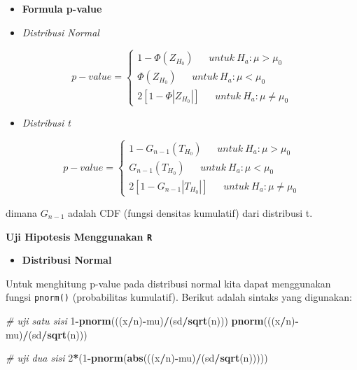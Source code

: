 \documentclass[]{book}
\newenvironment{Shaded}{\begin{snugshade}}{\end{snugshade}}
\newcommand{\KeywordTok}[1]{\textcolor[rgb]{0.13,0.29,0.53}{\textbf{#1}}}
\newcommand{\DecValTok}[1]{\textcolor[rgb]{0.00,0.00,0.81}{#1}}
\newcommand{\CommentTok}[1]{\textcolor[rgb]{0.56,0.35,0.01}{\textit{#1}}}
\newcommand{\OperatorTok}[1]{\textcolor[rgb]{0.81,0.36,0.00}{\textbf{#1}}}
\newcommand{\NormalTok}[1]{#1}
\providecommand{\tightlist}{%
  \setlength{\itemsep}{0pt}\setlength{\parskip}{0pt}}
\begin{document}
\begin{itemize}
\item
  \textbf{Formula p-value}
\item
  \emph{Distribusi Normal}
\end{itemize}

\begin{equation}
p-value =
  \begin{cases}
    1-\Phi\left(Z_{H_0}\right)\ \ \ \ \ \ \ untuk\ H_a:\mu>\mu_0\\
    \Phi\left(Z_{H_0}\right)\ \ \ \ \ \ \ untuk\ H_a:\mu<\mu_0\\
    2\left[1-\Phi\left|Z_{H_0}\right|\right]\ \ \ \ \ \ \ untuk\ H_a:\mu\ne \mu_0
    \end{cases}
  \label{eq:stparam3}
\end{equation}

\begin{itemize}
\tightlist
\item
  \emph{Distribusi t}
\end{itemize}

\begin{equation}
p-value =
  \begin{cases}
    1-G_{n-1}\left(T_{H_0}\right)\ \ \ \ \ \ \ untuk\ H_a:\mu>\mu_0\\
    G_{n-1}\left(T_{H_0}\right)\ \ \ \ \ \ \ untuk\ H_a:\mu<\mu_0\\
    2\left[1-G_{n-1}\left|T_{H_0}\right|\right]\ \ \ \ \ \ \ untuk\ H_a:\mu\ne \mu_0
    \end{cases}
  \label{eq:stparam4}
\end{equation}

dimana \(G_{n-1}\) adalah CDF (fungsi densitas kumulatif) dari
distribusi t.

\textbf{Uji Hipotesis Menggunakan \texttt{R}}

\begin{itemize}
\tightlist
\item
  \textbf{Distribusi Normal}
\end{itemize}

Untuk menghitung p-value pada distribusi normal kita dapat menggunakan
fungsi \texttt{pnorm()} (probabilitas kumulatif). Berikut adalah sintaks
yang digunakan:

\begin{Shaded}
\begin{Highlighting}[]
\CommentTok{# uji satu sisi}
\DecValTok{1}\OperatorTok{-}\KeywordTok{pnorm}\NormalTok{(((x}\OperatorTok{/}\NormalTok{n)}\OperatorTok{-}\NormalTok{mu)}\OperatorTok{/}\NormalTok{(sd}\OperatorTok{/}\KeywordTok{sqrt}\NormalTok{(n)))}
\KeywordTok{pnorm}\NormalTok{(((x}\OperatorTok{/}\NormalTok{n)}\OperatorTok{-}\NormalTok{mu)}\OperatorTok{/}\NormalTok{(sd}\OperatorTok{/}\KeywordTok{sqrt}\NormalTok{(n)))}

\CommentTok{# uji dua sisi}
\DecValTok{2}\OperatorTok{*}\NormalTok{(}\DecValTok{1}\OperatorTok{-}\KeywordTok{pnorm}\NormalTok{(}\KeywordTok{abs}\NormalTok{(((x}\OperatorTok{/}\NormalTok{n)}\OperatorTok{-}\NormalTok{mu)}\OperatorTok{/}\NormalTok{(sd}\OperatorTok{/}\KeywordTok{sqrt}\NormalTok{(n)))))}
\end{Highlighting}
\end{Shaded}
\end{document}
